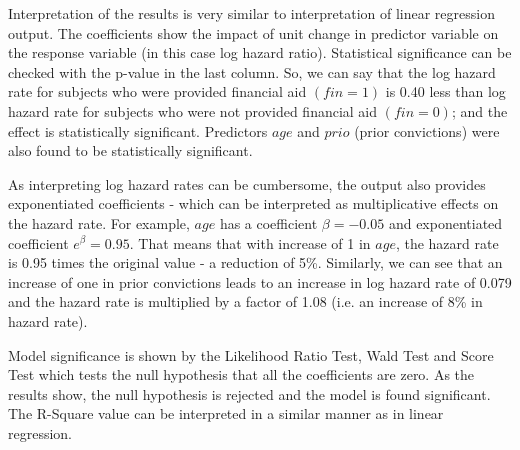 \documentclass[11pt, letterpaper, twoside]{memoir}\usepackage{knitr}
\begin{document}
Interpretation of the results is very similar to interpretation of linear regression output. The coefficients show the impact of unit change in predictor variable on the response variable (in this case log hazard ratio). Statistical significance can be checked with the p-value in the last column. So, we can say that the log hazard rate for subjects who were provided financial aid $(fin = 1)$ is 0.40 less than log hazard rate for subjects who were not provided financial aid $(fin = 0)$; and the effect is statistically significant. Predictors $age$ and $prio$ (prior convictions) were also found to be statistically significant. 

As interpreting log hazard rates can be cumbersome, the output also provides exponentiated coefficients - which can be interpreted as multiplicative effects on the hazard rate. For example, $age$ has a coefficient $\beta = -0.05$ and exponentiated coefficient $e^\beta = 0.95$. That means that with increase of 1 in $age$, the hazard rate is 0.95 times the original value - a reduction of 5\%. Similarly, we can see that an increase of one in prior convictions leads to an increase in log hazard rate of 0.079 and the hazard rate is multiplied by a factor of 1.08 (i.e. an increase of 8\% in hazard rate).

Model significance is shown by the Likelihood Ratio Test, Wald Test and Score Test which tests the null hypothesis that all the coefficients are zero. As the results show, the null hypothesis is rejected and the model is found significant. The R-Square value can be interpreted in a similar manner as in linear regression.
\end{document}
